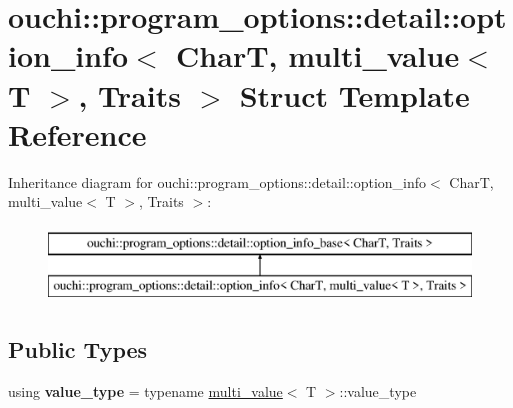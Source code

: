 \hypertarget{structouchi_1_1program__options_1_1detail_1_1option__info_3_01_char_t_00_01multi__value_3_01_t_01_4_00_01_traits_01_4}{}\section{ouchi\+::program\+\_\+options\+::detail\+::option\+\_\+info$<$ CharT, multi\+\_\+value$<$ T $>$, Traits $>$ Struct Template Reference}
\label{structouchi_1_1program__options_1_1detail_1_1option__info_3_01_char_t_00_01multi__value_3_01_t_01_4_00_01_traits_01_4}
Inheritance diagram for ouchi\+::program\+\_\+options\+::detail\+::option\+\_\+info$<$ CharT, multi\+\_\+value$<$ T $>$, Traits $>$\+:\begin{figure}[H]
\begin{center}
\leavevmode
\includegraphics[height=2.000000cm]{structouchi_1_1program__options_1_1detail_1_1option__info_3_01_char_t_00_01multi__value_3_01_t_01_4_00_01_traits_01_4}
\end{center}
\end{figure}
\subsection*{Public Types}
\begin{DoxyCompactItemize}
\item 
\mbox{\label{structouchi_1_1program__options_1_1detail_1_1option__info_3_01_char_t_00_01multi__value_3_01_t_01_4_00_01_traits_01_4_a8d7be43fc1880efd313c82d7726dc468}} 
using {\bfseries value\+\_\+type} = typename \mbox{\hyperlink{structouchi_1_1program__options_1_1detail_1_1multi__value}{multi\+\_\+value}}$<$ T $>$\+::value\+\_\+type
\end{DoxyCompactItemize}
